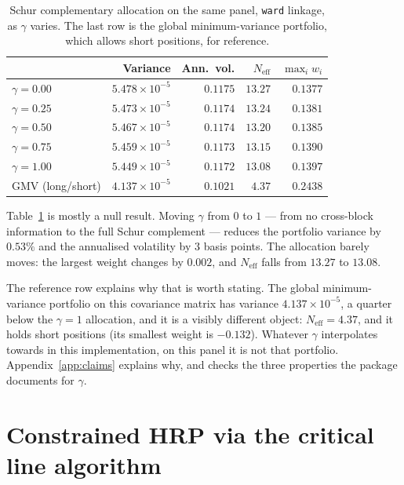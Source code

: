 \documentclass[11pt,a4paper]{article}
\newcommand{\code}[1]{\texttt{#1}}
\newcounter{algo}
\begin{document}
\begin{table}[t]
\centering
\caption{Schur complementary allocation on the same panel, \code{ward} linkage,
as $\gamma$ varies. The last row is the global minimum-variance portfolio,
which allows short positions, for reference.}
\label{tab:gamma}
\begin{tabular}{lrrrr}
\toprule
& Variance & Ann.\ vol. & $N_{\mathrm{eff}}$ & $\max_i w_i$ \\
\midrule
$\gamma = 0.00$ & $5.478 \times 10^{-5}$ & $0.1175$ & $13.27$ & $0.1377$ \\
$\gamma = 0.25$ & $5.473 \times 10^{-5}$ & $0.1174$ & $13.24$ & $0.1381$ \\
$\gamma = 0.50$ & $5.467 \times 10^{-5}$ & $0.1174$ & $13.20$ & $0.1385$ \\
$\gamma = 0.75$ & $5.459 \times 10^{-5}$ & $0.1173$ & $13.15$ & $0.1390$ \\
$\gamma = 1.00$ & $5.449 \times 10^{-5}$ & $0.1172$ & $13.08$ & $0.1397$ \\
\midrule
GMV (long/short) & $4.137 \times 10^{-5}$ & $0.1021$ & $4.37$ & $0.2438$ \\
\bottomrule
\end{tabular}
\end{table}

Table~\ref{tab:gamma} is mostly a null result. Moving $\gamma$ from $0$ to $1$ --- from no cross-block
information to the full Schur complement --- reduces the portfolio variance by
$0.53\%$ and the annualised volatility by $3$ basis points. The allocation
barely moves: the largest weight changes by $0.002$, and $N_{\mathrm{eff}}$
falls from $13.27$ to $13.08$.

The reference row explains why that is worth stating. The global
minimum-variance portfolio on this covariance matrix has variance
$4.137 \times 10^{-5}$, a quarter below the $\gamma=1$ allocation, and it is a
visibly different object: $N_{\mathrm{eff}} = 4.37$, and it holds short
positions (its smallest weight is $-0.132$). Whatever $\gamma$ interpolates
towards in this implementation, on this panel it is not that portfolio.
Appendix~\ref{app:claims} explains why, and checks the three properties the
package documents for $\gamma$.

\section{Constrained HRP via the critical line algorithm}
\label{sec:cla}
\end{document}
